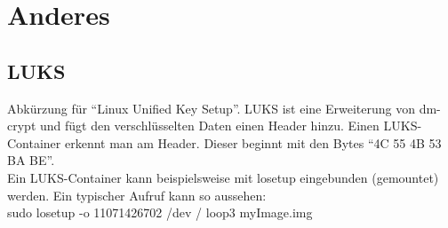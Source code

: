 \section{Anderes}
\subsection{LUKS}
Abkürzung für \enquote{Linux Unified Key Setup}. LUKS ist eine Erweiterung von dm-crypt und fügt den verschlüsselten Daten einen Header hinzu. Einen LUKS-Container erkennt man am Header. Dieser beginnt mit den Bytes \enquote{4C 55 4B 53 BA BE}.\\
Ein LUKS-Container kann beispielsweise mit losetup eingebunden (gemountet) werden. Ein typischer Aufruf kann so aussehen:\\
sudo losetup -o 11071426702 /dev / loop3 myImage.img\\

\clearpage
